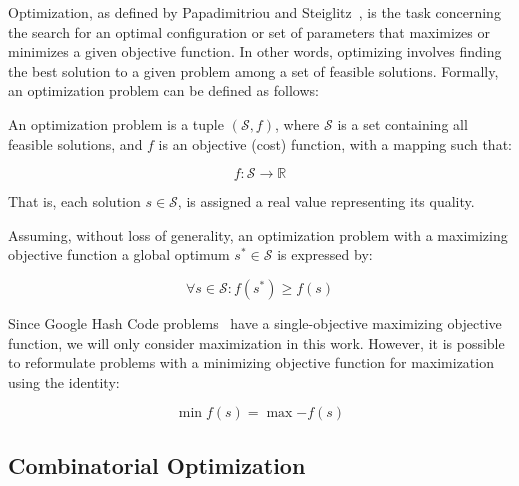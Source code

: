 Optimization, as defined by Papadimitriou and
Steiglitz~\cite{papadimitriou1998combinatorial}, is the task concerning the
search for an optimal configuration or set of parameters that maximizes or
minimizes a given objective function. In other words, optimizing involves
finding the best solution to a given problem among a set of feasible
solutions. Formally, an optimization problem can be defined as follows:

\begin{definition}
  \label{def:optimization-problem}
  An optimization problem is a tuple $(\mathcal{S}, f)$, where
  $\mathcal{S}$ is a set containing all feasible solutions, and $f$ is an
  objective (cost) function, with a mapping such that:

  \begin{equation}
    \label{eq:optimization-problem}
    f \colon \mathcal{S} \longrightarrow \mathbb{R}
  \end{equation}

  That is, each solution $s \in \mathcal{S}$, is assigned a real value
  representing its quality.
\end{definition}

\begin{definition}
  \label{def:global-optimum}
  Assuming, without loss of generality, an optimization problem with a maximizing
  objective function a global optimum $s^* \in \mathcal{S}$ is expressed by:

  \begin{equation}
    \forall s \in \mathcal{S} \colon f(s^{*}) \geq f(s)
  \end{equation}

\end{definition}

Since Google Hash Code problems~\cite{googlellc2023codingcompetitionsarchive}
have a single-objective maximizing objective function, we will only consider
maximization in this work. However, it is possible to reformulate problems with
a minimizing objective function for maximization~\cite{nocedal2006numerical}
using the identity:

\begin{equation}
  \label{eq:max2min}
  \min{f(s)} = \max{-f(s)}
\end{equation}

\subsection{Combinatorial Optimization}
\label{subsec:combinatorial-optimization}

